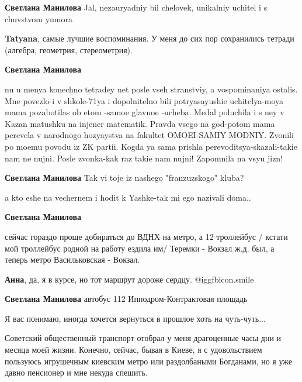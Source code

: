 \begin{itemize}
\begin{itemize}
\begin{itemize}
\textbf{Светлана Манилова} Jal, nezauryadniy bil chelovek, unikalniy uchitel i s chuvstvom yumora

\textbf{Tatyana}, самые лучшие воспоминания. У меня до сих пор сохранились тетради (алгебра, геометрия, стереометрия).

\textbf{Светлана Манилова} 

nu u menya konechno tetradey net posle vseh stranstviy, a vospominaniya
ostalis. Mne povezlo-i v shkole-71ya i dopolnitelno bili potryasayushie
uchitelya-moya mama pozabotilas ob etom -samoe glavnoe -ucheba. Medal poluchila
i s ney v Kazan matushku na injener matematik. Pravda vsego na god-potom mama
perevela v narodnogo hozyaystva na fakultet OMOEI-SAMIY MODNIY. Zvonili po
moemu povodu iz ZK partii. Kogda ya sama prishla perevoditsya-skazali-takie nam
ne nujni. Posle zvonka-kak raz takie nam nujni! Zapomnila na vsyu jizn!


\textbf{Светлана Манилова} Tak vi toje iz nashego "franzuzskogo" kluba?

a kto eshe na vechernem i hodit k Yashke-tak mi ego nazivali doma..
\end{itemize} %

\end{itemize} %

\textbf{Светлана Манилова} 

сейчас гораздо проще добираться до ВДНХ на метро, а 12 троллейбус / кстати мой
троллейбус родной на работу ездила им/ Теремки - Вокзал ж.д. был, а теперь
метро Васильковская - Вокзал.

\begin{itemize} %
\textbf{Анна}, да, я в курсе, но тот маршрут дороже сердцу. @igg{fbicon.smile} 

\textbf{Светлана Манилова} автобус 112 Ипподром-Контрактовая площадь

Я вас понимаю, иногда хочется вернуться в прошлое хоть на чуть-чуть...
\end{itemize} %


Советский общественный транспорт отобрал у меня драгоценные часы дни и месяца
моей жизни. Конечно, сейчас, бывая в Киеве, я с удовольствием пользуюсь
игрушечным киевским метро или раздолбаными Богданами, но я уже давно пенсионер
и мне некуда спешить.


\end{itemize}
